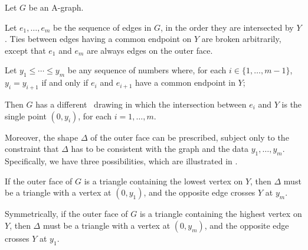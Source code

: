 \begin{thm}

\begin{compactitem}
\item Let $G$ be an A-graph.
\item Let $e_1,\ldots,e_m$ be the sequence of edges in $G$,
  in the order they are intersected by $Y$. Ties between edges having
  a common endpoint on $Y$ are broken arbitrarily,
except that $e_1$ and $e_m$ are
always edges on the outer face.
\item Let $y_1\le\cdots\le y_m$ be any sequence of numbers where, for
  each $i\in\{1,\ldots,m-1\}$, $y_i=y_{i+1}$ if and only if $e_i$
  and $e_{i+1}$ have a common endpoint in $Y$;
			
			
\end{compactitem}
Then $G$ has a different \Fary\ drawing in which the intersection
between $e_i$ and $Y$ is the single point $(0,y_i)$, for each
$i=1,\ldots,m$.

Moreover, the shape  $\Delta$ of the outer face can be prescribed,
subject only to the constraint that $\Delta$
has to be consistent with the graph and the data $y_1,\ldots,y_m$.
Specifically, we have three possibilities, which
 are illustrated in .

\begin{compactenum}[a)]
\item If the outer face of $G$ is a triangle containing the lowest
  vertex on $Y$, then $\Delta$ must be a triangle with a vertex at
  $(0,y_1)$, and the opposite edge crosses $Y$ at $y_m$.
\item Symmetrically, if the outer face of $G$ is a triangle containing
  the highest vertex on $Y$, then $\Delta$ must be a triangle with a vertex
  at $(0,y_m)$, and the opposite edge crosses $Y$ at $y_1$.
			

\end{compactenum}
\end{thm}
